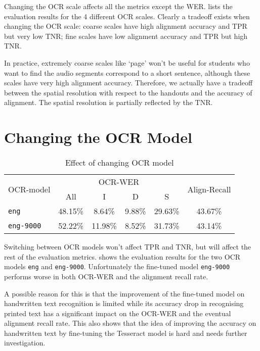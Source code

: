 Changing the OCR scale affects all the metrics except the WER.  lists the evaluation results for the 4 different OCR scales. Clearly a tradeoff exists when changing the OCR scale: coarse scales have high alignment accuracy and TPR but very low TNR; fine scales have low alignment accuracy and TPR but high TNR.

In practice, extremely coarse scales like `page' won't be useful for students who want to find the audio segments correspond to a short sentence, although these scales have very high alignment accuracy. Therefore, we actually have a tradeoff between the spatial resolution with respect to the handouts and the accuracy of alignment. The spatial resolution is partially reflected by the TNR.

\section{Changing the OCR Model}

\begin{table}[!tb]
    \caption{Effect of changing OCR model}
    \centering
    \label{tab:eval-res-ocr-model}
    \begin{tabular}{l c c c c c}
    \toprule
    \multirow{2}{*}{OCR-model} &\multicolumn{4}{c}{OCR-WER} & \multirow{2}{*}{Align-Recall} \\
    \cmidrule{2-5}
     & All & I & D & S & \\
    \midrule
    \texttt{eng} & 48.15\%&8.64\%&9.88\%&29.63\%&43.67\%\\
    \texttt{eng-9000} & 52.22\%&11.98\%&8.52\%&31.73\%&43.14\%\\
    \bottomrule
    \end{tabular}
\end{table}

Switching between OCR models won't affect TPR and TNR, but will affect the rest of the evaluation metrics.  shows the evaluation results for the two OCR models \texttt{eng} and \texttt{eng-9000}. Unfortunately the fine-tuned model \texttt{eng-9000} performs worse in both OCR-WER and the alignment recall rate.

A possible reason for this is that the improvement of the fine-tuned model on handwritten text recognition is limited while its accuracy drop in recognising printed text has a significant impact on the OCR-WER and the eventual alignment recall rate. This also shows that the idea of improving the accuracy on handwritten text by fine-tuning the Tesseract model is hard and needs further investigation.

